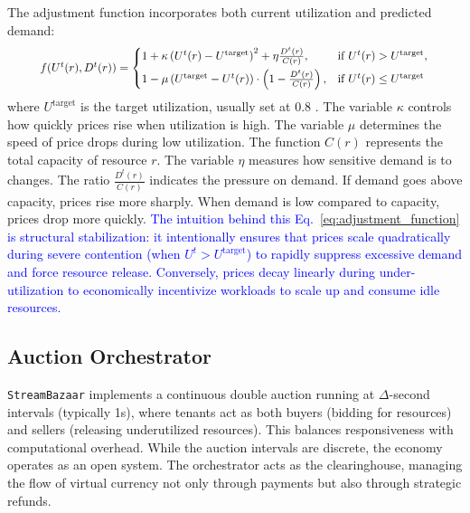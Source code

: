 \documentclass[lettersize,journal]{IEEEtran}
\begin{document}
The adjustment function incorporates both current utilization and predicted demand:
\begin{equation}
\label{eq:adjustment_function}
\resizebox{0.89\columnwidth}{!}{$
f(U^t(r), D^t(r)) =
\begin{cases}
1 + \kappa \left(U^t(r) - U^{\text{target}}\right)^2 + \eta \frac{D^t(r)}{C(r)},
& \text{if } U^t(r) > U^{\text{target}}, \\[1ex]
1 - \mu \left(U^{\text{target}} - U^t(r)\right) \cdot \left(1 - \frac{D^t(r)}{C(r)}\right),
& \text{if } U^t(r) \leq U^{\text{target}}
\end{cases}
$}
\end{equation}
where  $U^{\text{target}}$ is the target utilization, usually set at 0.8 \cite{10.1145/3303849}. The variable $\kappa$ controls how quickly prices rise when utilization is high. The variable $\mu$ determines the speed of price drops during low utilization. The function $C(r)$ represents the total capacity of resource $r$. The variable $\eta$ measures how sensitive demand is to changes. The ratio $\frac{D^t(r)}{C(r)}$ indicates the pressure on demand. If demand goes above capacity, prices rise more sharply. When demand is low compared to capacity, prices drop more quickly.
\textcolor{blue}{The intuition behind this Eq.~\ref{eq:adjustment_function} is structural stabilization: it intentionally ensures that prices scale quadratically during severe contention (when $U^t > U^{\text{target}}$) to rapidly suppress excessive demand and force resource release. Conversely, prices decay linearly during under-utilization to economically incentivize workloads to scale up and consume idle resources.}

\subsection{Auction Orchestrator}
\label{subsec:auction_mechanism}
\texttt{StreamBazaar} implements a continuous double auction running at $\Delta$-second intervals (typically 1s), where tenants act as both buyers (bidding for resources) and sellers (releasing underutilized resources). This balances responsiveness with computational overhead. While the auction intervals are discrete, the economy operates as an open system. The orchestrator acts as the clearinghouse, managing the flow of virtual currency not only through payments but also through strategic refunds.
\end{document}
